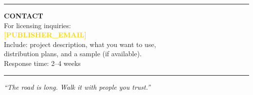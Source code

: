 \documentclass[10pt]{article}
\begin{document}
\begin{center}
\begin{minipage}{0.95\linewidth}
{\begin{minipage}{0.98\linewidth}
\begin{minipage}{0.95\linewidth}
          \vspace{0.15in}
          \rule{0.8\linewidth}{0.4pt}
          \vspace{0.1in}

          \begin{minipage}{0.95\linewidth}
            \centering
            \textbf{\color{gold}CONTACT}\\[0.05in]
            \textcolor{textlight}{For licensing inquiries:}\\
            \textcolor{gold}{\textbf{[PUBLISHER\_EMAIL]}}\\[0.05in]
            \small \textcolor{textmuted}{
              Include: project description, what you want to use,\\
              distribution plans, and a sample (if available).
            }\\[0.05in]
            \textcolor{textmuted}{Response time: 2--4 weeks}
          \end{minipage}

          \vspace{0.15in}
          \rule{0.6\linewidth}{0.4pt}
          \vspace{0.1in}

          {\small \textit{\textcolor{textmuted}{``The road is long. Walk it with people you trust.''}}}

          \vspace{0.1in}
        \end{minipage}

        \vspace{0.1in}
      \end{minipage}
    }
  \end{minipage}
\end{center}
\end{document}
